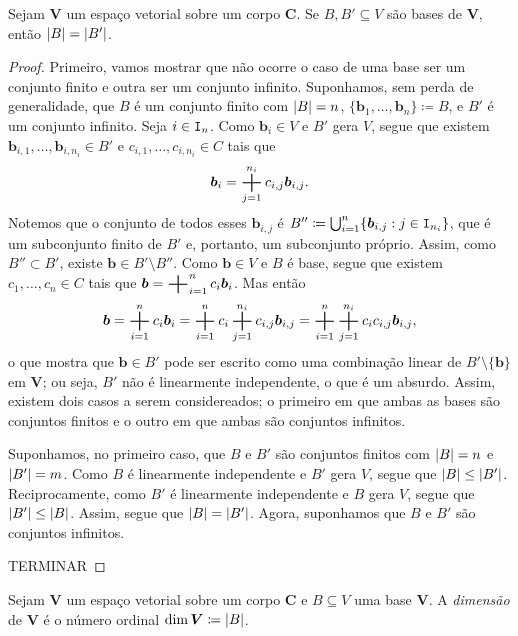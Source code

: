 \begin{teo}
	Sejam $\bm V$ um espaço vetorial sobre um corpo $\bm C$. Se $B,B' \subseteq V$ são bases de $\bm V$, então $\left\vert{B}\right\vert = \left\vert{B'}\right\vert$.
\end{teo}
\begin{proof}
	Primeiro, vamos mostrar que não ocorre o caso de uma base ser um conjunto finito e outra ser um conjunto infinito. Suponhamos, sem perda de generalidade, que $B$ é um conjunto finito com $\left\vert{B}\right\vert=n$, $\{\bm b_1,\ldots,\bm b_n\} \coloneqq B$, e $B'$ é um conjunto infinito. Seja $i \in \mathtt I_n$. Como $\bm b_i \in V$ e $B'$ gera $V$, segue que existem $\bm b_{i,1}, \ldots, \bm b_{i,n_i} \in B'$ e $c_{i,1}, \ldots, c_{i,n_i} \in C$ tais que
	\begin{equation*}
	\bm b_i = \bigsum_{j=1}^{n_i} c_{i,j} \bm b_{i,j}.
	\end{equation*}
Notemos que o conjunto de todos esses $\bm b_{i,j}$ é $B'' \coloneqq \bigcup_{i=1}^n \{\bm b_{i,j} : j \in \mathtt I_{n_i}\}$, que é um subconjunto finito de $B'$ e, portanto, um subconjunto próprio. Assim, como $B'' \subset B'$, existe $\bm b \in B' \setminus B''$. Como $\bm b \in V$ e $B$ é base, segue que existem $c_1, \ldots, c_n \in C$ tais que $\bm b = \bigsum_{i=1}^n c_i \bm b_i$. Mas então
	\begin{equation*}
	\bm b = \bigsum_{i=1}^n c_i \bm b_i = \bigsum _{i=1}^n c_i \bigsum_{j=1}^{n_i} c_{i,j} \bm b_{i,j} = \bigsum _{i=1}^n \bigsum_{j=1}^{n_i} c_ic_{i,j} \bm b_{i,j},
	\end{equation*}
o que mostra que $\bm b \in B'$ pode ser escrito como uma combinação linear de $B' \setminus \{\bm b\}$ em $\bm V$; ou seja, $B'$ não é linearmente independente, o que é um absurdo. Assim, existem dois casos a serem considereados; o primeiro em que ambas as bases são conjuntos finitos e o outro em que ambas são conjuntos infinitos.

	Suponhamos, no primeiro caso, que $B$ e $B'$ são conjuntos finitos com $\left\vert{B}\right\vert=n$ e $\left\vert{B'}\right\vert=m$. Como $B$ é linearmente independente e $B'$ gera $V$, segue que $\left\vert{B}\right\vert \leq \left\vert{B'}\right\vert$. Reciprocamente, como $B'$ é linearmente independente e $B$ gera $V$, segue que $\left\vert{B'}\right\vert \leq \left\vert{B}\right\vert$. Assim, segue que $\left\vert{B}\right\vert = \left\vert{B'}\right\vert$. Agora, suponhamos que $B$ e $B'$ são conjuntos infinitos.

TERMINAR
\end{proof}

\begin{defi}
	Sejam $\bm V$ um espaço vetorial sobre um corpo $\bm C$ e $B \subseteq V$ uma base $\bm V$. A \emph{dimensão} de $\bm V$ é o número ordinal
	$\dim \bm V \coloneqq \left\vert{B}\right\vert$.
\end{defi}

